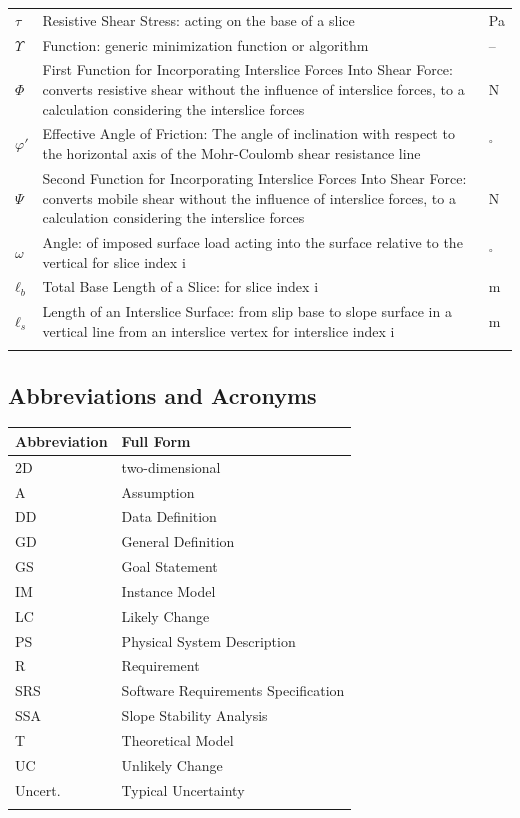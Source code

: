 \documentclass[12pt]{article}
\begin{document}
\begin{longtabu}{l X[l] l}
\\
$τ$ & Resistive Shear Stress: acting on the base of a slice & Pa
\\
$Υ$ & Function: generic minimization function or algorithm & --
\\
$Φ$ & First Function for Incorporating Interslice Forces Into Shear Force: converts resistive shear without the influence of interslice forces, to a calculation considering the interslice forces & N
\\
$φ'$ & Effective Angle of Friction: The angle of inclination with respect to the horizontal axis of the Mohr-Coulomb shear resistance line & ${}^{\circ}$
\\
$Ψ$ & Second Function for Incorporating Interslice Forces Into Shear Force: converts mobile shear without the influence of interslice forces, to a calculation considering the interslice forces & N
\\
$ω$ & Angle: of imposed surface load acting into the surface relative to the vertical for slice index i & ${}^{\circ}$
\\
${ℓ_{b}}$ & Total Base Length of a Slice: for slice index i & m
\\
${ℓ_{s}}$ & Length of an Interslice Surface: from slip base to slope surface in a vertical line from an interslice vertex for interslice index i & m
\\
\bottomrule
\label{Table:ToS}
\end{longtabu}
\subsection{Abbreviations and Acronyms}
\label{Sec:TAbbAcc}
\begin{longtable*}{l l}
\toprule
Abbreviation & Full Form
\\
\midrule
\endhead
2D & two-dimensional
\\
A & Assumption
\\
DD & Data Definition
\\
GD & General Definition
\\
GS & Goal Statement
\\
IM & Instance Model
\\
LC & Likely Change
\\
PS & Physical System Description
\\
R & Requirement
\\
SRS & Software Requirements Specification
\\
SSA & Slope Stability Analysis
\\
T & Theoretical Model
\\
UC & Unlikely Change
\\
Uncert. & Typical Uncertainty
\\
\bottomrule
\label{Table:TAbbAcc}
\end{longtable*}
\end{document}
